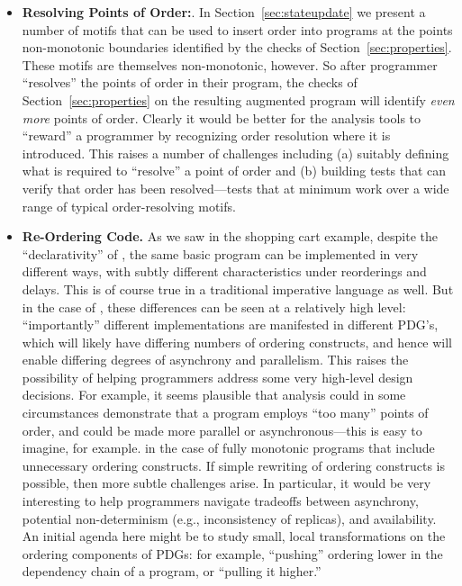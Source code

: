 \begin{itemize}
    \item {\bf Resolving Points of Order:}.  In Section~\ref{sec:stateupdate} we present a number of motifs that can be used to insert order into programs at the points non-monotonic boundaries identified by the checks of Section~\ref{sec:properties}.  These motifs are themselves non-monotonic, however.  So after programmer ``resolves'' the points of order in their program, the checks of Section~\ref{sec:properties} on the resulting augmented program will identify {\em even more} points of order.  Clearly it would be better for the analysis tools to ``reward'' a programmer by recognizing order resolution where it is introduced.  This raises a number of challenges including (a) suitably defining what is required to ``resolve'' a point of order and (b) building tests that can verify that order has been resolved---tests that at minimum work over a wide range of typical order-resolving motifs.    
    
    \item {\bf Re-Ordering Code.} As we saw in the shopping cart example, despite the ``declarativity'' of \lang, the same basic program can be implemented in very different ways, with subtly different characteristics under reorderings and delays.  This is of course true in a traditional imperative language as well.  But in the case of \lang, these differences can be seen at a relatively high level: ``importantly'' different implementations are manifested in different PDG's, which will likely have differing numbers of ordering constructs, and hence will enable differing degrees of asynchrony and parallelism.  This raises the possibility of helping programmers address some very high-level design decisions.  For example, it seems plausible that analysis could in some circumstances demonstrate that a program employs ``too many'' points of order, and could be made more parallel or asynchronous---this is easy to imagine, for example. in the case of fully monotonic programs that include unnecessary ordering constructs.  If simple rewriting of ordering constructs is possible, then more subtle challenges arise.  In particular, it would be very interesting to help programmers navigate tradeoffs between asynchrony, potential non-determinism (e.g., inconsistency of replicas), and availability.  An initial agenda here might be to study small, local transformations on the ordering components of PDGs: for example, ``pushing'' ordering lower in the dependency chain of a program, or ``pulling it higher.''


\end{itemize}
